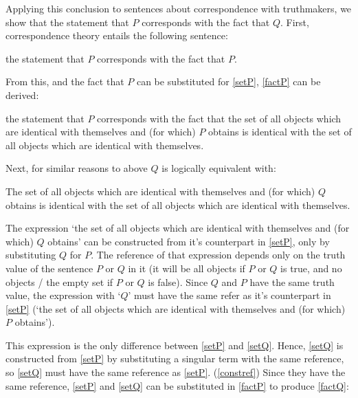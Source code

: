 Applying this conclusion to sentences about correspondence with truthmakers, we show that the statement that $P$ corresponds with the fact that $Q$.
First, correspondence theory entails the following sentence:

	\begin{example}\label{stateP}
	the statement that $P$ corresponds with the fact that $P$.
	\end{example}

From this, and the fact that $P$ can be substituted for \ref{setP}, \ref{factP} can be derived:

	\begin{example}\label{factP}
	the statement that $P$ corresponds with the fact that the set of all objects which are identical with themselves and (for which) $P$ obtains is identical with the set of all objects which are identical with themselves.
	\end{example}

Next, for similar reasons to above $Q$ is logically equivalent with:

	\begin{example}\label{setQ}
	The set of all objects which are identical with themselves and (for which) $Q$ obtains is identical with the set of all objects which are identical with themselves.
	\end{example}

The expression `the set of all objects which are identical with themselves and (for which) $Q$ obtains' can be constructed from it's counterpart in \ref{setP}, only by substituting $Q$ for $P$.
The reference of that expression depends only on the truth value of the sentence $P$ or $Q$ in it (it will be all objects if $P$ or $Q$ is true, and no objects / the empty set if $P$ or $Q$ is false).
Since $Q$ and $P$ have the same truth value, the expression with `$Q$' must have the same refer as it's counterpart in \ref{setP} (`the set of all objects which are identical with themselves and (for which) $P$ obtains').

This expression is the only difference between \ref{setP} and \ref{setQ}.
Hence, \ref{setQ} is constructed from \ref{setP} by substituting a singular term with the same reference, so \ref{setQ} must have the same reference as \ref{setP}. (\ref{constref})
Since they have the same reference, \ref{setP} and \ref{setQ} can be substituted in \ref{factP} to produce \ref{factQ}:

